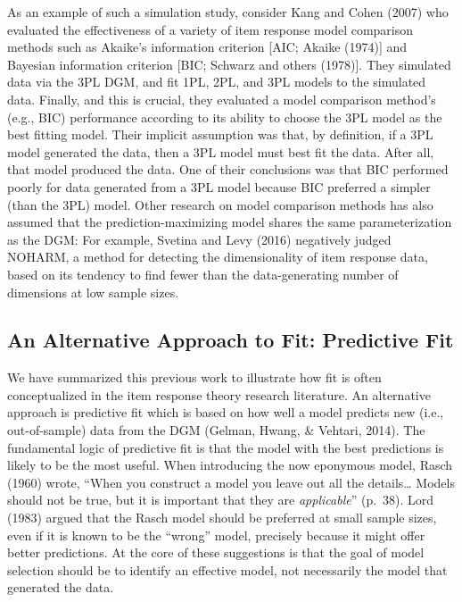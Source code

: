 \documentclass[
  english,
  man,floatsintext]{apa7}
\begin{document}
As an example of such a simulation study, consider Kang and Cohen (2007) who evaluated the effectiveness of a variety of item response model comparison methods such as Akaike's information criterion {[}AIC; Akaike (1974){]} and Bayesian information criterion {[}BIC; Schwarz and others (1978){]}. They simulated data via the 3PL DGM, and fit 1PL, 2PL, and 3PL models to the simulated data. Finally, and this is crucial, they evaluated a model comparison method's (e.g., BIC) performance according to its ability to choose the 3PL model as the best fitting model. Their implicit assumption was that, by definition, if a 3PL model generated the data, then a 3PL model must best fit the data. After all, that model produced the data. One of their conclusions was that BIC performed poorly for data generated from a 3PL model because BIC preferred a simpler (than the 3PL) model. Other research on model comparison methods has also assumed that the prediction-maximizing model shares the same parameterization as the DGM: For example, Svetina and Levy (2016) negatively judged NOHARM, a method for detecting the dimensionality of item response data, based on its tendency to find fewer than the data-generating number of dimensions at low sample sizes.

\hypertarget{an-alternative-approach-to-fit-predictive-fit}{%
\subsection{An Alternative Approach to Fit: Predictive Fit}\label{an-alternative-approach-to-fit-predictive-fit}}

We have summarized this previous work to illustrate how fit is often conceptualized in the item response theory research literature. An alternative approach is predictive fit which is based on how well a model predicts new (i.e., out-of-sample) data from the DGM (Gelman, Hwang, \& Vehtari, 2014). The fundamental logic of predictive fit is that the model with the best predictions is likely to be the most useful. When introducing the now eponymous model, Rasch (1960) wrote, ``When you construct a model you leave out all the details\ldots{} Models should not be true, but it is important that they are \emph{applicable}'' (p.~38). Lord (1983) argued that the Rasch model should be preferred at small sample sizes, even if it is known to be the ``wrong'' model, precisely because it might offer better predictions. At the core of these suggestions is that the goal of model selection should be to identify an effective model, not necessarily the model that generated the data.
\end{document}
